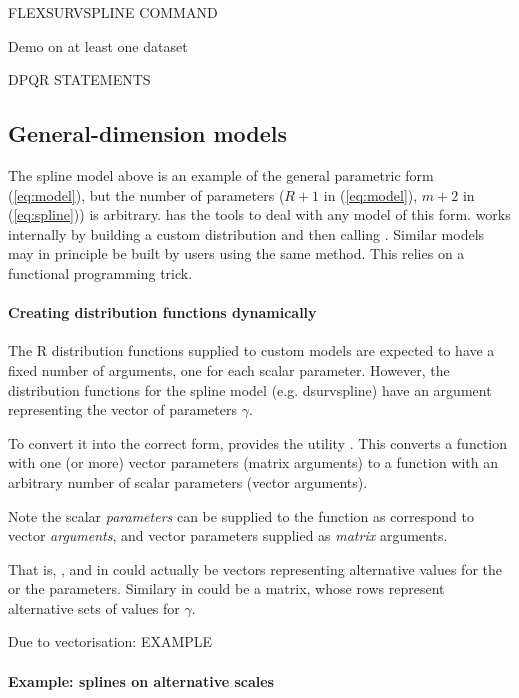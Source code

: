\documentclass[nojss,nofooter]{jss}
\begin{document}
FLEXSURVSPLINE COMMAND

Demo on at least one dataset 

DPQR STATEMENTS


\subsection{General-dimension models}
\label{sec:gdim}

The spline model above is an example of the general parametric form
(\ref{eq:model}), but the number of parameters ($R+1$ in
(\ref{eq:model}), $m+2$ in (\ref{eq:spline})) is arbitrary.
 has the tools to deal with any model of this form.
 works internally by building a custom
distribution and then calling .  Similar models may
in principle be built by users using the same method.  This relies on
a functional programming trick.

\paragraph{Creating distribution functions dynamically}

The R distribution functions supplied to custom models are expected to
have a fixed number of arguments, one for each scalar parameter.
However, the distribution functions for the spline model
(e.g. dsurvspline) have an argument  representing the
vector of parameters $\gamma$.  


To convert it into the correct form,  provides the
utility .  This converts a function with one (or
more) vector parameters (matrix arguments) to a function with an
arbitrary number of scalar parameters (vector arguments).

Note the scalar \emph{parameters} can be supplied to the function as
correspond to vector \emph{arguments}, and vector parameters supplied
as \emph{matrix} arguments.

That is, , and  in
 could actually be vectors representing
alternative values for the  or the parameters.  Similary
 in  could be a matrix,
  whose rows represent alternative sets of values for $\gamma$.

Due to vectorisation:  EXAMPLE



\paragraph{Example: splines on alternative scales}
\end{document}
